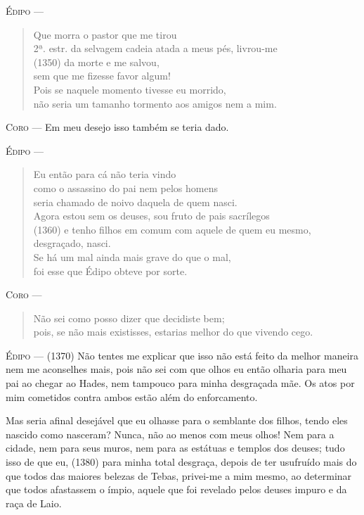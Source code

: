 \textsc{Édipo} --- \begin{verse}Que morra o pastor que me tirou\\ 2ª. estr.
da selvagem cadeia atada a meus pés, livrou-me\\ (1350)
da morte e me salvou,\\
sem que me fizesse favor algum!\\
Pois se naquele momento tivesse eu morrido,\\
não seria um tamanho tormento aos amigos nem a mim.
\end{verse}

\textsc{Coro} --- Em meu desejo isso também se teria dado.

\textsc{Édipo} --- \begin{verse}Eu então para cá não teria vindo\\
como o assassino do pai nem pelos homens\\
seria chamado de noivo daquela de quem nasci.\\
Agora estou sem os deuses, sou fruto de pais sacrílegos\\ (1360)
e tenho filhos em comum com aquele de quem eu mesmo, desgraçado, nasci.\\
Se há um mal ainda mais grave do que o mal,\\
foi esse que Édipo obteve por sorte.
\end{verse}

\textsc{Coro} --- \begin{verse}Não sei como posso dizer que decidiste bem;\\
pois, se não mais existisses, estarias melhor do que vivendo cego.
\end{verse}

\textsc{Édipo} --- (1370) Não tentes me explicar que isso não está feito da melhor maneira
nem me aconselhes mais, pois não sei com que olhos eu então olharia para
meu pai ao chegar ao Hades, nem tampouco para minha desgraçada mãe. Os
atos por mim cometidos contra ambos estão além do enforcamento.

Mas seria afinal desejável que eu olhasse para o semblante dos filhos,
tendo eles nascido como nasceram? Nunca, não ao menos com meus olhos!
Nem para a cidade, nem para seus muros, nem para as estátuas e templos
dos deuses; tudo isso de que eu, (1380) para minha total desgraça,
depois de ter usufruído mais do que todos das maiores belezas de Tebas,
privei-me a mim mesmo, ao determinar que todos afastassem o ímpio,
aquele que foi revelado pelos deuses impuro e da raça de Laio.

